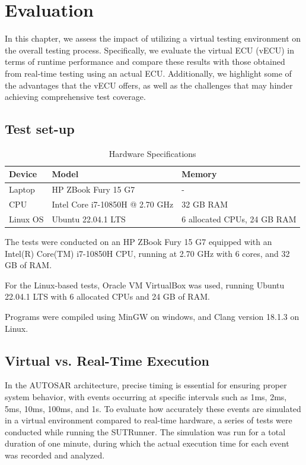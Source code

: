 
\chapter{Evaluation}\label{chapter:Evaluation}

In this chapter, we assess the impact of utilizing a virtual testing environment on the overall testing process. Specifically, we evaluate the virtual ECU (vECU) in terms of runtime performance and compare these results with those obtained from real-time testing using an actual ECU. Additionally, we highlight some of the advantages that the vECU offers, as well as the challenges that may hinder achieving comprehensive test coverage.

\section{Test set-up}
\begin{table}[h]
    \centering
    \begin{tabular}{|l|l|l|}
        \hline
        \textbf{Device} & \textbf{Model} & \textbf{Memory} \\ \hline
        Laptop & HP ZBook Fury 15 G7 & - \\ \hline
        CPU & Intel Core i7-10850H @ 2.70 GHz & 32 GB RAM \\ \hline
        Linux OS & Ubuntu 22.04.1 LTS & 6 allocated CPUs, 24 GB RAM \\ \hline
    \end{tabular}
    \caption{Hardware Specifications}
\end{table}

The tests were conducted on an HP ZBook Fury 15 G7 equipped with an Intel(R) Core(TM) i7-10850H CPU, running at 2.70 GHz with 6 cores, and 32 GB of RAM.

For the Linux-based tests, Oracle VM VirtualBox was used, running Ubuntu 22.04.1 LTS with 6 allocated CPUs and 24 GB of RAM.

Programs were compiled using MinGW on windows, and Clang version 18.1.3 on Linux. 

\section{Virtual vs. Real-Time Execution}

In the AUTOSAR architecture, precise timing is essential for ensuring proper system behavior, with events occurring at specific intervals such as 1ms, 2ms, 5ms, 10ms, 100ms, and 1s. To evaluate how accurately these events are simulated in a virtual environment compared to real-time hardware, a series of tests were conducted while running the SUTRunner. The simulation was run for a total duration of one minute, during which the actual execution time for each event was recorded and analyzed.


